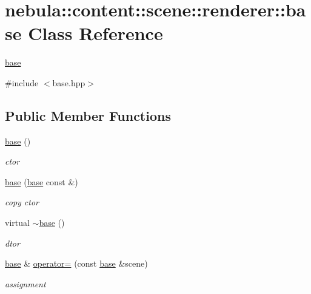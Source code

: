 \hypertarget{classnebula_1_1content_1_1scene_1_1renderer_1_1base}{
\section{nebula::content::scene::renderer::base Class Reference}
\label{classnebula_1_1content_1_1scene_1_1renderer_1_1base}
}


\hyperlink{classnebula_1_1content_1_1scene_1_1renderer_1_1base}{base}  


{\ttfamily \#include $<$base.hpp$>$}\subsection*{Public Member Functions}
\begin{DoxyCompactItemize}
\item 
\hyperlink{classnebula_1_1content_1_1scene_1_1renderer_1_1base_a789a397ad7a9964cfe33f8cbbc2583e2}{base} ()
\begin{DoxyCompactList}\small\item\em ctor \item\end{DoxyCompactList}\item 
\hyperlink{classnebula_1_1content_1_1scene_1_1renderer_1_1base_a1cb15c1d5b1016581fc481590ec1dc72}{base} (\hyperlink{classnebula_1_1content_1_1scene_1_1renderer_1_1base}{base} const \&)
\begin{DoxyCompactList}\small\item\em copy ctor \item\end{DoxyCompactList}\item 
virtual \hyperlink{classnebula_1_1content_1_1scene_1_1renderer_1_1base_aefd8d338eb039f83ec80dfb0332cdf9f}{$\sim$base} ()
\begin{DoxyCompactList}\small\item\em dtor \item\end{DoxyCompactList}\item 
\hyperlink{classnebula_1_1content_1_1scene_1_1renderer_1_1base}{base} \& \hyperlink{classnebula_1_1content_1_1scene_1_1renderer_1_1base_ad5bdfb8cf4fbdb0a833e604a5ca30e59}{operator=} (const \hyperlink{classnebula_1_1content_1_1scene_1_1renderer_1_1base}{base} \&scene)
\begin{DoxyCompactList}\small\item\em assignment \item\end{DoxyCompactList}\end{DoxyCompactItemize}
